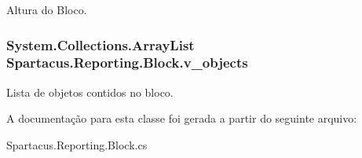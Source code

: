 Altura do Bloco. 

\hypertarget{classSpartacus_1_1Reporting_1_1Block_a78390216040968b609ea02a22b6df29d}{
\subsubsection[{v\+\_\+objects}]{\setlength{\rightskip}{0pt plus 5cm}System.\+Collections.\+Array\+List Spartacus.\+Reporting.\+Block.\+v\+\_\+objects}}\label{classSpartacus_1_1Reporting_1_1Block_a78390216040968b609ea02a22b6df29d}


Lista de objetos contidos no bloco. 



A documentação para esta classe foi gerada a partir do seguinte arquivo\+:\begin{DoxyCompactItemize}
\item 
Spartacus.\+Reporting.\+Block.\+cs\end{DoxyCompactItemize}
